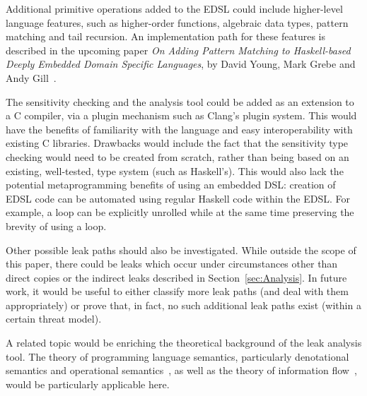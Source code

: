 \documentclass[10pt, conference]{IEEEtran}
\begin{document}
Additional primitive operations added to the EDSL could include higher-level language features, such as higher-order
functions, algebraic data types, pattern matching and tail recursion. An implementation path for
these features is described in the upcoming paper \textit{On Adding Pattern Matching to Haskell-based Deeply Embedded Domain Specific Languages}, by
David Young, Mark Grebe and Andy Gill~\cite{PatMatchingEDSL}.

The sensitivity checking and the analysis tool could be added as an extension to
a C compiler, via a plugin mechanism such as Clang's plugin system. This would
have the benefits of familiarity with the language and easy interoperability
with existing C libraries. Drawbacks would include the fact that the sensitivity type
checking would need to be created from scratch, rather than being based on an existing, well-tested,
type system (such as Haskell's). This would also lack the potential metaprogramming
benefits of using an embedded DSL: creation of EDSL code can be automated using
regular Haskell code within the EDSL. For example, a loop can be explicitly unrolled while
at the same time preserving the brevity of using a loop.

Other possible leak paths should also be investigated. While outside the scope of this paper,
there could be leaks which occur under circumstances other than direct copies or the indirect
leaks described in Section~\ref{sec:Analysis}. In future work, it would be useful to either
classify more leak paths (and deal with them appropriately) or prove that, in fact, no such additional
leak paths exist (within a certain threat model).

A related topic would be enriching the theoretical background of the leak analysis tool. The theory of
programming language semantics, particularly denotational semantics and operational semantics~\cite{WinskelBook}, as well
as the theory of information flow~\cite{InfoFlowAnalysis}, would be particularly applicable here.
\end{document}
